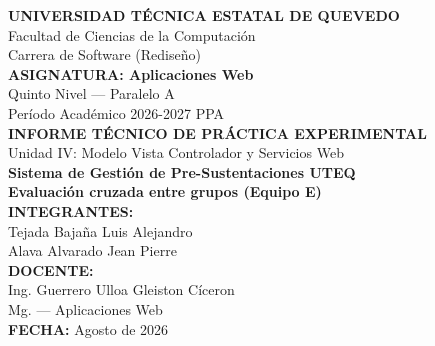 \begin{titlepage}
\centering
\vspace*{1cm}
{\LARGE \textbf{UNIVERSIDAD TÉCNICA ESTATAL DE QUEVEDO}}\\[0.3cm]
{\large Facultad de Ciencias de la Computación}\\[0.2cm]
{\large Carrera de Software (Rediseño)}\\[0.8cm]

{\large \textbf{ASIGNATURA: Aplicaciones Web}}\\[0.3cm]
{\large Quinto Nivel --- Paralelo A}\\[0.3cm]
{\large Período Académico 2026-2027 PPA}\\[1.2cm]

{\Large \textbf{INFORME TÉCNICO DE PRÁCTICA EXPERIMENTAL}}\\[0.3cm]
{\large Unidad IV: Modelo Vista Controlador y Servicios Web}\\[0.6cm]
{\LARGE \textbf{Sistema de Gestión de Pre-Sustentaciones UTEQ}}\\[1.2cm]

{\large \textbf{Evaluación cruzada entre grupos (Equipo E)}}\\[0.5cm]

\vfill
{\large \textbf{INTEGRANTES:}}\\[0.3cm]
{\large Tejada Bajaña Luis Alejandro}\\[0.1cm]
{\large Alava Alvarado Jean Pierre}\\[1cm]

{\large \textbf{DOCENTE:}}\\[0.3cm]
{\large Ing. Guerrero Ulloa Gleiston Cíceron}\\[0.3cm]
{\large Mg. --- Aplicaciones Web}\\[1cm]

{\large \textbf{FECHA:} Agosto de 2026}\\[0.5cm]
\end{titlepage}
